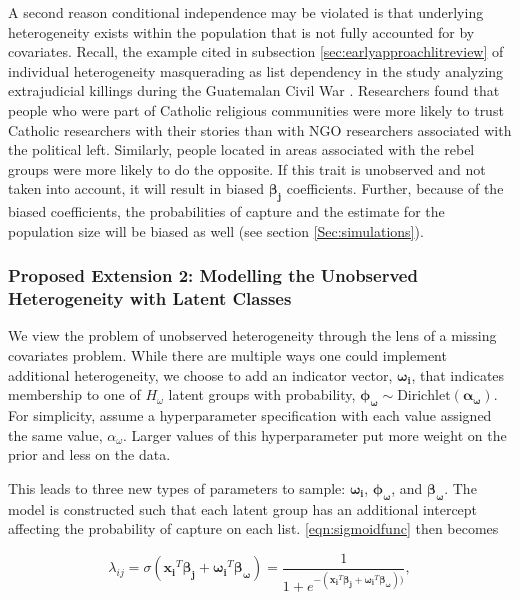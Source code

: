 \documentclass[
  12pt,
]{article}
\begin{document}
A second reason conditional independence may be violated is that
underlying heterogeneity exists within the population that is not fully
accounted for by covariates. Recall, the example cited in subsection
\ref{sec:earlyapproachlitreview} of individual heterogeneity
masquerading as list dependency in the study analyzing extrajudicial
killings during the Guatemalan Civil War \citep{ball_making_2000}.
Researchers found that people who were part of Catholic religious
communities were more likely to trust Catholic researchers with their
stories than with NGO researchers associated with the political left.
Similarly, people located in areas associated with the rebel groups were
more likely to do the opposite. If this trait is unobserved and not
taken into account, it will result in biased \(\boldsymbol{\beta_j}\)
coefficients. Further, because of the biased coefficients, the
probabilities of capture and the estimate for the population size will
be biased as well (see section \ref{Sec:simulations}).

\subsubsection{Proposed Extension 2: Modelling the Unobserved Heterogeneity with Latent Classes}

We view the problem of unobserved heterogeneity through the lens of a
missing covariates problem. While there are multiple ways one could
implement additional heterogeneity, we choose to add an indicator
vector, \(\boldsymbol{\omega_i}\), that indicates membership to one of
\(H_\omega\) latent groups with probability,
\(\boldsymbol{\phi_\omega}\sim \text{Dirichlet}(\boldsymbol{\alpha_\omega})\).
For simplicity, assume a hyperparameter specification with each value
assigned the same value, \(\alpha_\omega\). Larger values of this
hyperparameter put more weight on the prior and less on the data.

This leads to three new types of parameters to sample:
\(\boldsymbol{\omega_i}\), \(\boldsymbol{\phi_\omega}\), and
\(\boldsymbol{\beta_\omega}\). The model is constructed such that each
latent group has an additional intercept affecting the probability of
capture on each list. \autoref{eqn:sigmoidfunc} then becomes

\begin{equation}
\label{eqn:sigmoidfunclatentvariable}
\lambda_{ij}=\sigma(\boldsymbol{x_i}^T\boldsymbol{\beta_j} + \boldsymbol{\omega_i}^T\boldsymbol{\beta_\omega}) = \frac{1}{1+e^{-(\boldsymbol{x_i}^T\boldsymbol{\beta_j}+\boldsymbol{\omega_i}^T\boldsymbol{\beta_\omega}))}},
\end{equation}
\end{document}
